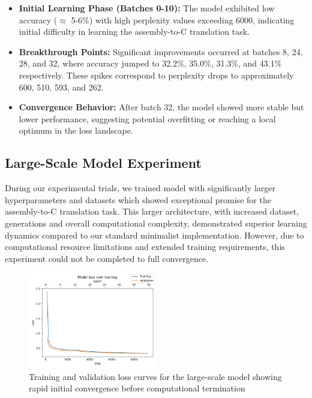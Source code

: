 \documentclass[../main.tex]{subfiles}
\begin{document}
\begin{itemize}
\item \textbf{Initial Learning Phase (Batches 0-10):} The model exhibited low accuracy ($\approx$ 5-6\%) with high perplexity values exceeding 6000, indicating initial difficulty in learning the assembly-to-C translation task.

\item \textbf{Breakthrough Points:} Significant improvements occurred at batches 8, 24, 28, and 32, where accuracy jumped to 32.2\%, 35.0\%, 31.3\%, and 43.1\% respectively. These spikes correspond to perplexity drops to approximately 600, 510, 593, and 262.

\item \textbf{Convergence Behavior:} After batch 32, the model showed more stable but lower performance, suggesting potential overfitting or reaching a local optimum in the loss landscape.
\end{itemize}

\subsection{Large-Scale Model Experiment}

During our experimental trials, we trained model with significantly larger hyperparameters and datasets which showed exceptional promise for the assembly-to-C translation task. This larger architecture, with increased dataset, generations and overall computational complexity, demonstrated superior learning dynamics compared to our standard minimalist implementation. However, due to computational resource limitations and extended training requirements, this experiment could not be completed to full convergence.

\begin{figure}[htbp]
\centering
\includegraphics[width=0.5\textwidth]{images/loss_per_step.png}
\caption{Training and validation loss curves for the large-scale model showing rapid initial convergence before computational termination}
\label{fig:large_model_loss}
\end{figure}
\end{document}
